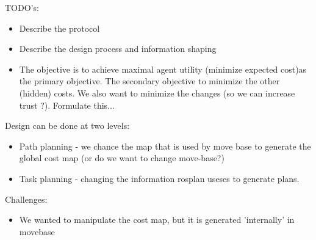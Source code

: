 TODO's:
\begin{itemize}
    \item Describe the protocol
    \item Describe the design process and information shaping 
    \item The objective is to achieve maximal agent utility (minimize expected cost)as the primary objective. The secondary objective to minimize the other (hidden) costs. We also want to minimize the changes (so we can increase trust ?). Formulate this...
\end{itemize}
Design can be done at two levels:
\begin{itemize}
\item Path planning - we chance the map that is used by move base to generate the global cost map (or do we want to change move-base?) 
\item Task planning - changing the information rosplan useses to generate plans.
\end{itemize}

Challenges:
\begin{itemize}
    \item We wanted to manipulate the cost map, but it is generated 'internally' in movebase
\end{itemize}
